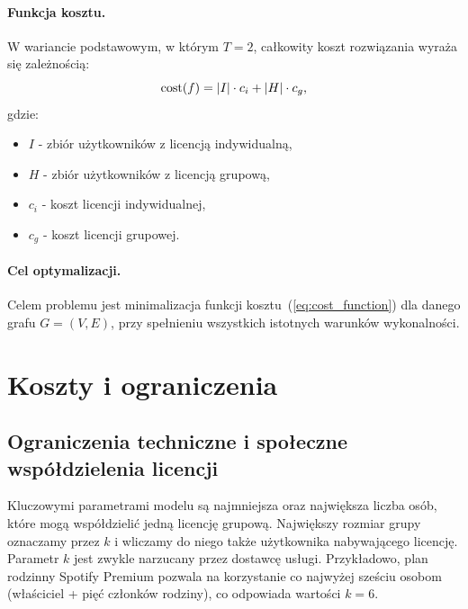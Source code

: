 \paragraph{Funkcja kosztu.}
W wariancie podstawowym, w którym $T=2$, całkowity koszt rozwiązania wyraża się zależnością:
\begin{equation}
  \operatorname{cost}(f) = |I|\cdot c_i + |H|\cdot c_g ,
  \label{eq:cost_function}
\end{equation}
gdzie:
\begin{itemize}
  \item $I$ - zbiór użytkowników z licencją indywidualną,
  \item $H$ - zbiór użytkowników z licencją grupową,
  \item $c_i$ - koszt licencji indywidualnej,
  \item $c_g$ - koszt licencji grupowej.
\end{itemize}

\paragraph{Cel optymalizacji.}
Celem problemu jest minimalizacja funkcji kosztu~(\ref{eq:cost_function}) dla danego grafu $G=(V,E)$, przy spełnieniu wszystkich istotnych warunków wykonalności.



\section{Koszty i ograniczenia}

\subsection{Ograniczenia techniczne i społeczne współdzielenia licencji}

Kluczowymi parametrami modelu są najmniejsza oraz największa liczba osób, które mogą współdzielić jedną licencję grupową. Największy rozmiar grupy oznaczamy przez $k$ i wliczamy do niego także użytkownika nabywającego licencję. Parametr $k$ jest zwykle narzucany przez dostawcę usługi. Przykładowo, plan rodzinny Spotify Premium pozwala na korzystanie co najwyżej sześciu osobom (właściciel + pięć członków rodziny), co odpowiada wartości $k=6$.

